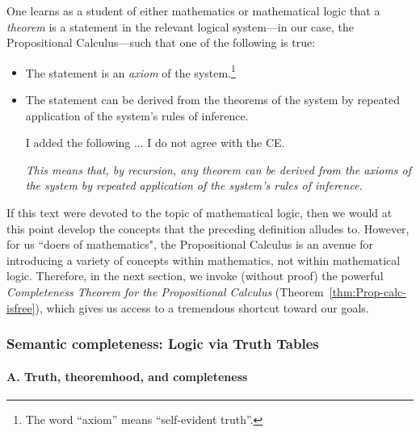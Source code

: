 One learns as a student of either mathematics or mathematical logic that a {\it theorem} is a statement in the relevant logical system---in our case, the Propositional Calculus---such that one of the following is true:
\begin{itemize}
\item
The statement is an {\it axiom} of the system.\footnote{The word ``axiom'' means ``self-evident truth''.}
\medskip\item
The statement can be derived from the theorems of the system by repeated application of the system's rules of inference.

\smallskip

{\Arny I added the following ... I do not agree with the CE.}

{\em This means that, by recursion, any theorem can be derived from the axioms of the system by repeated application of the system's rules of inference.}
\end{itemize}
If this text were devoted to the topic of mathematical logic, then we would at this point develop the concepts that the preceding definition alludes to.  However, for us ``doers of mathematics", the Propositional Calculus is an avenue for introducing a variety of concepts within mathematics, not within mathematical logic.  Therefore, in the next section, we invoke (without proof) the powerful {\it Completeness Theorem for the Propositional Calculus} 
(Theorem~\ref{thm:Prop-calc-isfree}), which gives us access to a tremendous shortcut toward our goals.

\subsubsection{Semantic completeness: Logic via Truth Tables}
\label{sec:truth-tables}

\paragraph {A. Truth, theoremhood, and completeness}

